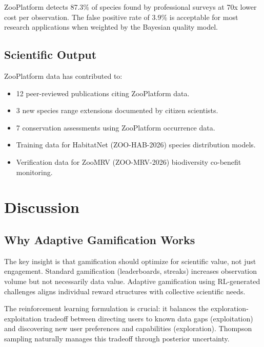 \documentclass[11pt,a4paper]{article}
\begin{document}
ZooPlatform detects 87.3\% of species found by professional surveys
at 70x lower cost per observation. The false positive rate of 3.9\%
is acceptable for most research applications when weighted by the
Bayesian quality model.

\subsection{Scientific Output}

ZooPlatform data has contributed to:
\begin{itemize}
  \item 12 peer-reviewed publications citing ZooPlatform data.
  \item 3 new species range extensions documented by citizen scientists.
  \item 7 conservation assessments using ZooPlatform occurrence data.
  \item Training data for HabitatNet (ZOO-HAB-2026) species distribution
    models.
  \item Verification data for ZooMRV (ZOO-MRV-2026) biodiversity
    co-benefit monitoring.
\end{itemize}


\section{Discussion}
\label{sec:discussion}

\subsection{Why Adaptive Gamification Works}

The key insight is that gamification should optimize for scientific value,
not just engagement. Standard gamification (leaderboards, streaks)
increases observation volume but not necessarily data value. Adaptive
gamification using RL-generated challenges aligns individual reward
structures with collective scientific needs.

The reinforcement learning formulation is crucial: it balances the
exploration-exploitation tradeoff between directing users to known data
gaps (exploitation) and discovering new user preferences and capabilities
(exploration). Thompson sampling naturally manages this tradeoff through
posterior uncertainty.
\end{document}

